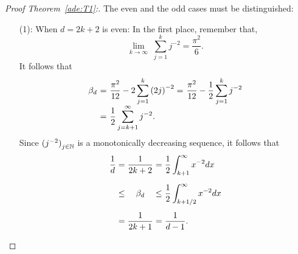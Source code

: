 \begin{proof}[Proof Theorem~\ref{ade:T1}:]\label{ade:T1P}
  The even and the odd cases must be distinguished:
  \begin{enumerate}
    \item[(1):] When $d = 2k+2$ is even:
    In the first place, remember that,
    \[ \lim_{k\to\infty}\; \sum_{j = 1}^{k} j^{-2} = \frac{\pi^2}{6}.\] 
    It follows that
    \[\everymath{\displaystyle}\arraycolsep=1.8pt\def\arraystretch{1.8}
      \begin{array}{rrlll}
        \beta_d & = & \frac{\pi^2}{12} - 2 \sum_{j = 1}^{k} {(2j)}^{-2}= & \frac{\pi^2}{12} - \frac{1}{2} \sum_{j = 1}^{k} j^{-2}\\
        & = & \frac{1}{2} \sum_{j = k+1}^{\infty} j^{-2}.
      \end{array}      
     \]
    Since ${(j^{-2})}_{j \in \mathbb{N}}$ is a monotonically decreasing sequence, it follows that
    \[\everymath{\displaystyle}\arraycolsep=1.5pt\def\arraystretch{1.5}
      \begin{array}{rrcll}
        \frac{1}{d}   & = & \frac{1}{2k+2}  & = & \frac{1}{2} \int_{k+1}^{\infty}x^{-2} dx\\[5mm]
      & \leq & \beta_d  & \leq & \frac{1}{2} \int_{k+1/2}^{\infty}x^{-2} dx\\[5mm]
      & = & \frac{1}{2k+1} & = & \frac{1}{d-1}.
    \end{array}  \] 


\end{enumerate}
\end{proof}
